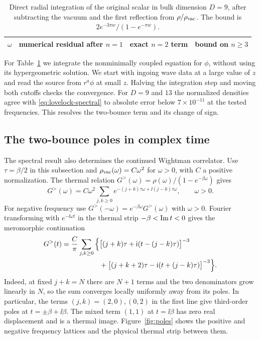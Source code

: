\begin{table}[t]
 \centering\small
 \begin{tabular}{cccc}
 \hline
 \(\omega\) & numerical residual after \(n=1\) & exact \(n=2\) term & bound on \(n\geq3\)\\
 \hline
 
 \end{tabular}
 \caption{Direct radial integration of the original scalar in bulk dimension
 \(D=9\), after subtracting the vacuum and the first reflection from
 \(\rho/\rho_{\rm vac}\). The bound is \(2e^{-3\pi w}/(1-e^{-\pi w})\).}
 \label{tab:lovelock}
\end{table}

For Table~\ref{tab:lovelock} we integrate the nonminimally coupled equation for \(\phi\), without using its hypergeometric solution. We start with ingoing wave data at a large value of \(z\) and read the source from \(r^a\phi\) at small \(z\). Halving the integration step and moving both cutoffs checks the convergence. For \(D=9\) and \(13\) the normalized densities agree with \eqref{eq:lovelock-spectral} to absolute error below \(7\times10^{-11}\) at the tested frequencies. This resolves the two-bounce term and its change of sign.

\subsection{The two-bounce poles in complex time}

The spectral result also determines the continued Wightman correlator. Use \(\tau=\beta/2\) in this subsection and \(\rho_{\rm vac}(\omega)=C\omega^2\) for \(\omega>0\), with \(C\) a positive normalization. The thermal relation \(G^>(\omega)=\rho(\omega)/(1-e^{-\beta\omega})\) gives
\begin{equation}
 G^>(\omega)=C\omega^2\sum_{j,k\geq0}
  e^{-(j+k)\tau\omega+\ii(j-k)\tau\omega},\qquad \omega>0 .
\end{equation}
For negative frequency use \(G^>(-\omega)=e^{-\beta\omega}G^>(\omega)\) with \(\omega>0\). Fourier transforming with \(e^{-\ii\omega t}\) in the thermal strip \(-\beta<{\rm Im}\,t<0\) gives the meromorphic continuation
\begin{align}
 G^>(t)=\frac{C}{\pi}\sum_{j,k\geq0}\Big\{&
 \big[(j+k)\tau+\mathrm{i}(t-(j-k)\tau)\big]^{-3}\notag\\
 &+\big[(j+k+2)\tau-\mathrm{i}(t+(j-k)\tau)\big]^{-3}\Big\}.
 \label{eq:lovelock-time}
\end{align}
Indeed, at fixed \(j+k=N\) there are \(N+1\) terms and the two denominators grow linearly in \(N\), so the sum converges locally uniformly away from its poles. In particular, the terms \((j,k)=(2,0),(0,2)\) in the first line give third-order poles at \(t=\pm\beta+\ii\beta\). The mixed term \((1,1)\) at \(t=\ii\beta\) has zero real displacement and is a thermal image. Figure~\ref{fig:poles} shows the positive and negative frequency lattices and the physical thermal strip between them.










